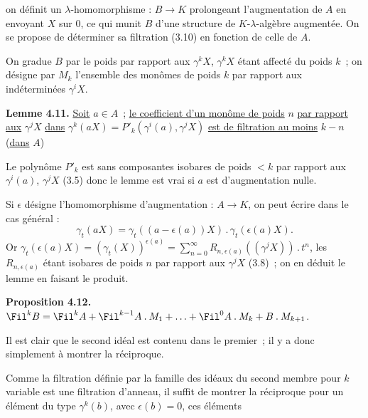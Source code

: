 
on
définit un \(\lambda\)-homomorphisme : \(B\to K\) prolongeant l'augmentation de \(A\) en envoyant \(X\) sur \(0\), ce qui munit \(B\) d'une structure de \(K\)-\(\lambda\)-algèbre augmentée. On se propose de déterminer sa filtration (3.10) en fonction de celle de \(A\).

On gradue \(B\) par le poids par rapport aux \(\gamma^k X\), \(\gamma^k X\) étant affecté du poids \(k\)~; on désigne par \(M_k\) l'ensemble des monômes de poids \(k\) par rapport aux indéterminées \(\gamma^i X\).

\textbf{Lemme 4.11.} \uline{Soit} \(a\in A\)~; \uline{le coefficient d'un monôme de poids} \(n\) \uline{par rapport} \uline{aux} \(\gamma^j X\) \uline{dans} \(\gamma^k(aX)=P'_k(\gamma^i(a),\gamma^j X)\) \uline{est de filtration au moins} \(k-n\) (\uline{dans} \(A\))

Le polynôme \(P'_k\) est sans composantes isobares de poids \(<k\) par rapport aux \(\gamma^i(a)\), \(\gamma^j X\) (3.5) donc le lemme est vrai si \(a\) est d'augmentation nulle.

Si \(\epsilon\) désigne l'homomorphisme d'augmentation : \(A\to K\), on peut écrire dans le cas général :
\[
  \gamma_t(aX)=\gamma_t((a-\epsilon(a))X)\mathbin{.}\gamma_t(\epsilon(a)X).
\]
Or \(\gamma_t(\epsilon(a)X)=(\gamma_t(X))^{\epsilon(a)}=\sum_{n=0}^{\infty}R_{n,\epsilon(a)}((\gamma^j X))\mathbin{.}t^n\), les \(R_{n,\epsilon(a)}\) étant isobares de poids \(n\) par rapport aux \(\gamma^j X\) (3.8)~; on en déduit le lemme en faisant le produit.

\textbf{Proposition 4.12.} \(\Fil^k B=\Fil^k A+\Fil^{k-1}A\mathbin{.}M_1+\ldots+\Fil^0 A\mathbin{.}M_k+B\mathbin{.}M_{k+1}\).

Il est clair que le second idéal est contenu dans le premier~; il y a donc simplement à montrer la réciproque.

Comme la filtration définie par la famille des idéaux du second membre pour \(k\) variable est une filtration d'anneau, il suffit de montrer la réciproque pour un élément du type \(\gamma^k(b)\), avec \(\epsilon(b)=0\), ces éléments
